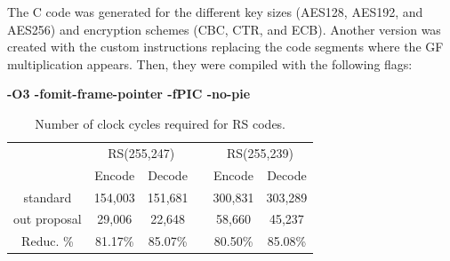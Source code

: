 The C code was generated for the different key sizes (AES128, AES192, and AES256) and encryption schemes (CBC, CTR, and ECB). Another version was created with the custom instructions replacing
the code segments where the GF multiplication appears. 
Then, they were compiled with the following flags: 

\begin{center}
\textbf{-O3 -fomit-frame-pointer -fPIC -no-pie}
\end{center}

\begin{table}[b]
    \begin{tabular}{ccclcc}
    \multicolumn{1}{l}{}              & \multicolumn{2}{c}{\cellcolor[HTML]{C0C0C0}RS(255,247)}         &                          & \multicolumn{2}{c}{\cellcolor[HTML]{C0C0C0}RS(255,239)}         \\
    \cellcolor[HTML]{FFFFFF}          & \cellcolor[HTML]{C0C0C0}Encode & \cellcolor[HTML]{C0C0C0}Decode & \cellcolor[HTML]{FFFFFF} & \cellcolor[HTML]{C0C0C0}Encode & \cellcolor[HTML]{C0C0C0}Decode \\ \hline
    \cellcolor[HTML]{EFEFEF}standard   & 154,003                         & 151,681                         &                          & 300,831                         & 303,289                         \\
    \cellcolor[HTML]{EFEFEF}out proposal    & 29,006                          & 22,648                          &                          & 58,660                          & 45,237                          \\
    \cellcolor[HTML]{EFEFEF}Reduc. \% & 81.17\%                          & 85.07\%                          &                          & 80.50\%                          & 85.08\%                         
    \end{tabular}
    \caption{Number of clock cycles required for RS codes.}
    \label{tab:rs}
\end{table}

